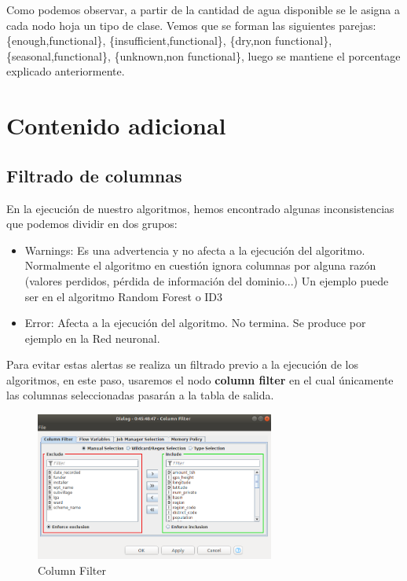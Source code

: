 	Como podemos observar, a partir de la cantidad de agua disponible se le asigna a cada nodo hoja un tipo de clase. Vemos que se forman las siguientes parejas:
	\{enough,functional\}, \{insufficient,functional\}, \{dry,non functional\}, \{seasonal,functional\}, \{unknown,non functional\}, luego se mantiene el porcentage explicado anteriormente.
	
	

	
	
	
	
	
	
	
	
	
	
	
	
	
	
	
	
	
	
	\section{Contenido adicional}
	
	
	\subsection{Filtrado de columnas}
	
	\hspace{1cm} En la ejecución de nuestro algoritmos, hemos encontrado algunas inconsistencias que podemos dividir en dos grupos:
	\begin{itemize}
		\item Warnings: Es una advertencia y no afecta a la ejecución del algoritmo. Normalmente el algoritmo en cuestión ignora columnas por alguna razón (valores perdidos, pérdida de información del dominio...)
		Un ejemplo puede ser en el algoritmo Random Forest o ID3
		
		\item Error: Afecta a la ejecución del algoritmo. No termina.
		Se produce por ejemplo en la Red neuronal.
	\end{itemize} 
	
	Para evitar estas alertas se realiza un filtrado previo a la ejecución de los algoritmos, en este paso, usaremos el nodo \textbf{column filter} en el cual únicamente las columnas seleccionadas pasarán a la tabla de salida.
	
	
	
	\begin{figure}[H]
		\centering
		\includegraphics[width=0.7\textwidth]{img/filtrar.png}
		\caption{Column Filter}
	\end{figure}
	
